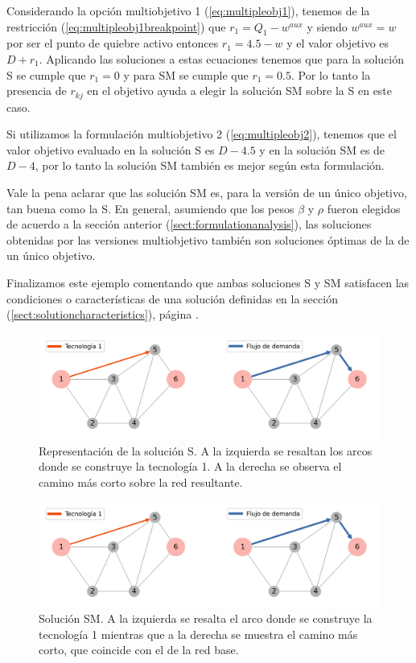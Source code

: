 Considerando la opción multiobjetivo 1 (\ref{eq:multipleobj1}), tenemos de la restricción (\ref{eq:multipleobj1breakpoint}) que $r_1 = Q_1 - w^{aux}$ y siendo $w^{aux} = w$ por ser el punto de quiebre activo entonces $r_1 = 4.5 - w$ y el valor objetivo es $D + r_1$. Aplicando las soluciones a estas ecuaciones tenemos que para la solución S se cumple que $r_1 = 0$ y para SM se cumple que $r_1 = 0.5$. Por lo tanto la presencia de $r_{kj}$ en el objetivo ayuda a elegir la solución SM sobre la S en este caso.

Si utilizamos la formulación multiobjetivo 2 (\ref{eq:multipleobj2}), tenemos que el valor objetivo evaluado en la solución S es $D - 4.5$ y en la solución SM es de $D - 4$, por lo tanto la solución SM también es mejor según esta formulación.

Vale la pena aclarar que las solución SM es, para la versión de un único objetivo, tan buena como la S. En general, asumiendo que los pesos $\beta$ y $\rho$ fueron elegidos de acuerdo a la sección anterior (\ref{sect:formulationanalysis}), las soluciones obtenidas por las versiones multiobjetivo también son soluciones óptimas de la de un único objetivo.

Finalizamos este ejemplo comentando que ambas soluciones S y SM satisfacen las condiciones o características de una solución definidas en la sección (\ref{sect:solutioncharacteristics}), página \pageref{sect:solutioncharacteristics}.

\begin{figure}[h!]
  \centering
  \includegraphics[width=\linewidth]{../resources/example_2_sol_v2.png}
  \caption{Representación de la solución S. A la izquierda se resaltan los arcos donde se construye la tecnología 1. A la derecha se observa el camino más corto sobre la red resultante.}
  \label{fig:example2solv2}
\end{figure}

\begin{figure}[h!]
  \centering
  \includegraphics[width=\linewidth]{../resources/example_2_sol_v1.png}
  \caption{Solución SM. A la izquierda se resalta el arco donde se construye la tecnología 1 mientras que a la derecha se muestra el camino más corto, que coincide con el de la red base.}
  \label{fig:example2solv1}
\end{figure}

